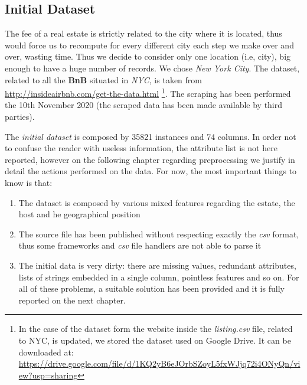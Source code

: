 \subsection{Initial Dataset}
The fee of a real estate is strictly related to the city where it is located, thus would force us to recompute for every different city each step we make over and over, wasting time. Thus we decide to consider only one location (i.e, city), big enough to have a huge number of records. We chose \textit{New York City}.
The dataset, related to all the \textbf{BnB} situated in \textit{NYC}, is taken from \url{http://insideairbnb.com/get-the-data.html} \footnote{In the case of the dataset form the website inside the \textit{listing.csv} file, related to NYC, is updated, we stored the dataset used on Google Drive. It can be downloaded at: \url{https://drive.google.com/file/d/1KQ2yB6eJOrbSZoyL5fxWJjq72i4ONyQn/view?usp=sharing}}. The scraping has been performed the 10th November 2020 (the scraped data has been made available by third parties).

The \textit{initial dataset} is composed by 35821 instances and 74 columns. In order not to confuse the reader with useless information, the attribute list is not here reported, however on the following chapter regarding preprocessing we justify in detail the actions performed on the data. For now, the most important things to know is that:

\begin{enumerate}
	\item The dataset is composed by various mixed features regarding the estate, the host and he geographical position
	\item The source file has been published without respecting exactly the \textit{csv} format, thus some frameworks and \textit{csv} file handlers are not able to parse it
	\item The initial data is very dirty: there are missing values, redundant attributes, lists of strings embedded in a single column, pointless features and so on. For all of these problems, a suitable solution has been provided and it is fully reported on the next chapter.
\end{enumerate}

\medskip 
